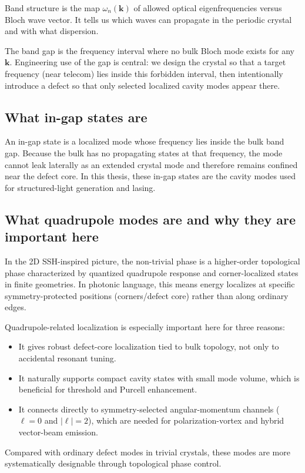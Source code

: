 \documentclass[12pt,a4paper,oneside]{book}
\theoremstyle{plain}
\theoremstyle{definition}
\theoremstyle{remark}
\begin{document}
Band structure is the map $\omega_n(\mathbf{k})$ of allowed optical eigenfrequencies versus Bloch wave vector. It tells us which waves can propagate in the periodic crystal and with what dispersion.

The band gap is the frequency interval where no bulk Bloch mode exists for any $\mathbf{k}$. Engineering use of the gap is central: we design the crystal so that a target frequency (near telecom) lies inside this forbidden interval, then intentionally introduce a defect so that only selected localized cavity modes appear there.

\subsection{What in-gap states are}

An in-gap state is a localized mode whose frequency lies inside the bulk band gap. Because the bulk has no propagating states at that frequency, the mode cannot leak laterally as an extended crystal mode and therefore remains confined near the defect core. In this thesis, these in-gap states are the cavity modes used for structured-light generation and lasing.

\subsection{What quadrupole modes are and why they are important here}

In the 2D SSH-inspired picture, the non-trivial phase is a higher-order topological phase characterized by quantized quadrupole response and corner-localized states in finite geometries. In photonic language, this means energy localizes at specific symmetry-protected positions (corners/defect core) rather than along ordinary edges.

Quadrupole-related localization is especially important here for three reasons:
\begin{itemize}
  \item It gives robust defect-core localization tied to bulk topology, not only to accidental resonant tuning.
  \item It naturally supports compact cavity states with small mode volume, which is beneficial for threshold and Purcell enhancement.
  \item It connects directly to symmetry-selected angular-momentum channels ($\ell=0$ and $|\ell|=2$), which are needed for polarization-vortex and hybrid vector-beam emission.
\end{itemize}
Compared with ordinary defect modes in trivial crystals, these modes are more systematically designable through topological phase control.
\end{document}
